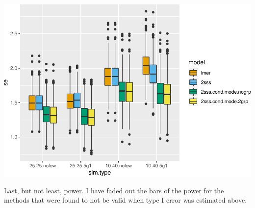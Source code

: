 \documentclass[
]{book}
\begin{document}
\includegraphics{4_video6_group_comparison_three_models_files/figure-latex/unnamed-chunk-9-1.pdf}

Last, but not least, power. I have faded out the bars of the power for the methods that were found to not be valid when type I error was estimated above.
\end{document}
